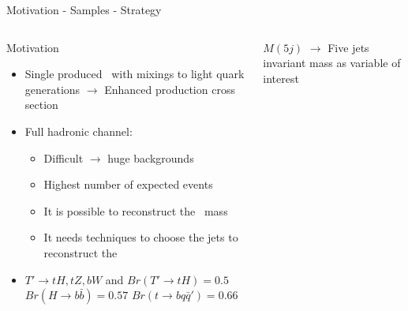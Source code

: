 \iffalse
\begin{frame}{Motivation - Samples - Strategy}
\vspace{-.5cm}

\begin{columns}
\begin{column}{.50\textwidth}
\begin{block}{Motivation}
\begin{itemize}\tiny
\item Single produced \Tp~with mixings to light quark generations $\to$ Enhanced production cross section
\item Full hadronic channel:
  \begin{itemize}\tiny
  \item Difficult $\to$ huge backgrounds
  \item Highest number of expected events
  \item It is possible to reconstruct the \Tp~mass
  \item It needs techniques to choose the jets to reconstruct the \Tp
  \end{itemize}
\item $T'\to tH, tZ, bW$ and $Br(T'\to tH)=0.5$ $Br(H\to b\bar{b})=0.57$ $Br(t\to bq\bar{q}')=0.66$
\end{itemize}
\end{block}
\end{column}

\begin{column}{.50\textwidth}
\begin{center}
\end{center}
\vspace{-.5cm}
\begin{block}{}
\tiny $M(5j)$ $\to$ Five jets invariant mass as variable of interest
\end{block}
\end{column}
\end{columns}


\end{frame}
